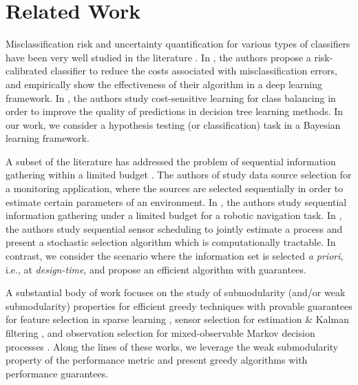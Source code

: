 \section{Related Work}
Misclassification risk and uncertainty quantification for various types of classifiers have been very well studied in the literature \cite{adams1999comparing,pendharkar2017bayesian,hou2013modeling}. In \cite{sensoy2021misclassification}, the authors propose a risk-calibrated classifier to reduce the costs associated with misclassification errors, and empirically show the effectiveness of their algorithm in a  deep learning framework. In \cite{elkan2001foundations}, the authors study cost-sensitive learning for class balancing in order to improve the quality of predictions in decision tree learning methods. In our work, we consider a hypothesis testing (or classification) task in a Bayesian learning framework. 

A subset of the literature has addressed the problem of sequential information gathering within a limited budget \cite{hollinger2013sampling,chen2015sequential}. The authors of  \cite{golovin2010near} study data source selection for a monitoring application, where the sources are selected sequentially in order to estimate certain parameters of an environment. In \cite{ghasemi2019online}, the authors study sequential information gathering under a limited budget for a robotic navigation task. In \cite{gupta2006stochastic}, the authors study sequential sensor scheduling to jointly estimate a process and present a stochastic selection algorithm which is computationally tractable.  In contrast, we consider the scenario where the information set is selected \textit{a priori}, i.e., at \textit{design-time}, and propose an efficient algorithm with guarantees. 

A substantial body of work focuses on the study of submodularity (and/or weak submodularity) properties for efficient greedy techniques with provable guarantees for feature selection in sparse learning \cite{krause2010submodular,chepuri2014sparsity}, sensor selection for estimation \cite{mo2011sensor,hashemi2020randomized,shamaiah2010greedy,krause2007near} \& Kalman filtering \cite{ye2018complexity}, and observation selection for mixed-observable Markov decision processes \cite{bhargav2023complexity}.  Along the lines of these works, we leverage the weak submodularity property of the performance metric and present greedy algorithms with performance guarantees.

